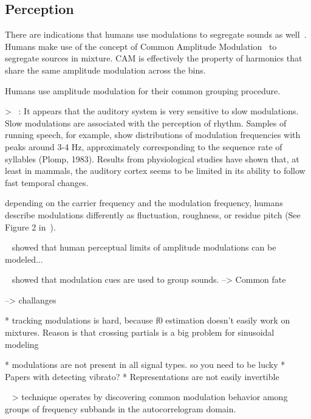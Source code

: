 \subsection{Perception}
There are indications that humans use modulations to segregate sounds as well~\cite{dau99}.
Humans make use of the concept of Common Amplitude Modulation~\cite{bregman90} to segregate sources in mixture.
CAM is effectively the property of harmonics that share the
same amplitude modulation across the bins.





Humans use amplitude modulation for their common grouping procedure.

> ~\cite{dau99}: It appears that the auditory system is very sensitive to slow modulations. Slow modulations are associated with the perception of rhythm. Samples of running speech, for example, show distributions of modulation frequencies with peaks around 3-4 Hz, approximately corresponding to the sequence rate of syllables (Plomp, 1983). Results from physiological studies have shown that, at least in mammals, the auditory cortex seems to be limited in its ability to follow fast temporal changes.

depending on the carrier frequency and the modulation frequency, humans describe modulations differently as fluctuation, roughness, or residue pitch (See Figure 2 in~\cite{joris04}).

~\cite{bacon89, dau99} showed that human perceptual limits of amplitude modulations can be modeled...

~\cite{mcadams89} showed that modulation cues are used to group sounds. 
--> Common fate

--> challanges

* tracking modulations is hard, because f0 estimation doesn't easily work on mixtures. Reason is that crossing partials is a big problem for sinusoidal modeling~\cite{viste03}

* modulations are not present in all signal types. so you need to be lucky 
* Papers with detecting vibrato?
* Representations are not easily invertible

~\cite{scheirer99}
> technique  operates  by  discovering  common  modulation  behavior among groups of frequency subbands in the autocorrelogram domain.  

